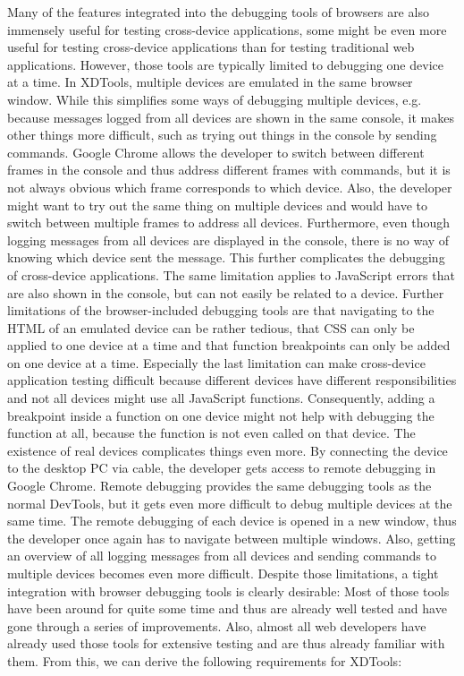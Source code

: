 Many of the features integrated into the debugging tools of browsers are also immensely useful for testing cross-device applications, some might be even more useful for testing cross-device applications than for testing traditional web applications. However, those tools are typically limited to debugging one device at a time. In XDTools, multiple devices are emulated in the same browser window. While this simplifies some ways of debugging multiple devices, e.g. because messages logged from all devices are shown in the same console, it makes other things more difficult, such as trying out things in the console by sending commands. Google Chrome allows the developer to switch between different frames in the console and thus address different frames with commands, but it is not always obvious which frame corresponds to which device. Also, the developer might want to try out the same thing on multiple devices and would have to switch between multiple frames to address all devices. Furthermore, even though logging messages from all devices are displayed in the console, there is no way of knowing which device sent the message. This further complicates the debugging of cross-device applications. The same limitation applies to JavaScript errors that are also shown in the console, but can not easily be related to a device. Further limitations of the browser-included debugging tools are that navigating to the HTML of an emulated device can be rather tedious, that CSS can only be applied to one device at a time and that function breakpoints can only be added on one device at a time. Especially the last limitation can make cross-device application testing difficult because different devices have different responsibilities and not all devices might use all JavaScript functions. Consequently, adding a breakpoint inside a function on one device might not help with debugging the function at all, because the function is not even called on that device. The existence of real devices complicates things even more. By connecting the device to the desktop PC via cable, the developer gets access to remote debugging in Google Chrome. Remote debugging provides the same debugging tools as the normal DevTools, but it gets even more difficult to debug multiple devices at the same time. The remote debugging of each device is opened in a new window, thus the developer once again has to navigate between multiple windows. Also, getting an overview of all logging messages from all devices and sending commands to multiple devices becomes even more difficult. Despite those limitations, a tight integration with browser debugging tools is clearly desirable: Most of those tools have been around for quite some time and thus are already well tested and have gone through a series of improvements. Also, almost all web developers have already used those tools for extensive testing and are thus already familiar with them. From this, we can derive the following requirements for XDTools:
